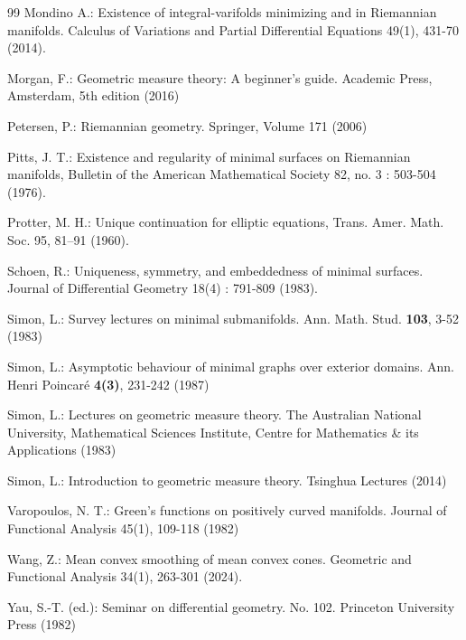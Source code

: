\documentclass[11pt]{amsart}
\theoremstyle{definition}
\begin{document}
\begin{thebibliography}{99}
    Mondino A.: Existence of integral-varifolds minimizing and in Riemannian manifolds. Calculus of Variations and Partial Differential Equations 49(1), 431-70 (2014).
	
	Morgan, F.: Geometric measure theory: A beginner's guide.  
	Academic Press, Amsterdam, 5th edition (2016)
	
	Petersen, P.: Riemannian geometry.  
	Springer, Volume 171 (2006)
    
	Pitts, J. T.: Existence and regularity of minimal surfaces on Riemannian manifolds, Bulletin of the American Mathematical Society 82, no. 3 : 503-504 (1976).
    
    Protter, M. H.: Unique continuation for elliptic equations, Trans. Amer. Math.
Soc. 95, 81–91 (1960). 
	
	Schoen, R.: Uniqueness, symmetry, and embeddedness of minimal surfaces. Journal of Differential Geometry 18(4) : 791-809 (1983).
	
	Simon, L.: Survey lectures on minimal submanifolds. Ann. Math. Stud. \textbf{103}, 3-52 (1983)
	
	Simon, L.: Asymptotic behaviour of minimal graphs over exterior domains. Ann. Henri Poincar\'e \textbf{4(3)}, 231-242 (1987)
	
	Simon, L.: Lectures on geometric measure theory.  
	The Australian National University, Mathematical Sciences Institute, Centre for Mathematics \& its Applications (1983)
	
	Simon, L.: Introduction to geometric measure theory.  
	Tsinghua Lectures (2014)
	
	Varopoulos, N. T.: Green's functions on positively curved manifolds.  
	Journal of Functional Analysis 45(1), 109-118 (1982)
	
	Wang, Z.: Mean convex smoothing of mean convex cones. Geometric and Functional Analysis 34(1), 263-301 (2024).
	
	Yau, S.-T. (ed.): Seminar on differential geometry. No. 102. Princeton University Press (1982)
\end{thebibliography}
\end{document}
